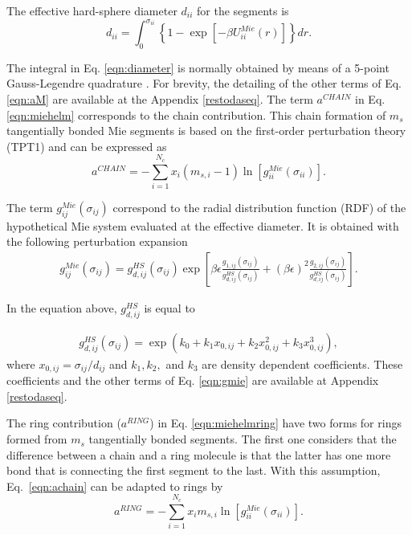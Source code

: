 	
	The effective hard-sphere diameter $d_{ii}$ for the segments is
	\begin{equation}
	d_{ii} =\int_{0}^{\sigma_{ii}} \left \lbrace 1 - \exp \left [-\beta U^{Mie}_{ii}(r) \right ] \right \rbrace dr .
	\label{eqn:diameter}
	\end{equation}
	
	
	The integral in Eq. \eqref{eqn:diameter} is normally obtained by means of a 5-point Gauss-Legendre quadrature \cite{papa2014}. For brevity, the detailing of the other terms of Eq. \eqref{eqn:aM} are available at the Appendix \ref{restodaseq}. The term $a^{CHAIN}$ in Eq. \ref{eqn:miehelm} corresponds to the chain contribution. This chain formation of $m_{s}$ tangentially bonded Mie segments is based on the first-order perturbation theory (TPT1)  \cite{papa2014} and can be expressed as
	\begin{equation}
	a^{CHAIN} =-\sum_{i=1}^{N_{c}} x_{i}(m_{s,i} - 1)\ln \left [ g_{ii}^{Mie}(\sigma_{ii}) \right] .
	\label{eqn:achain}
	\end{equation}
		
	The term $g_{ij}^{Mie}(\sigma_{ij})$ correspond to the radial distribution function (RDF) of the hypothetical Mie system evaluated at the effective diameter. It is obtained with the following perturbation expansion
	\begin{equation}
	\begin{aligned}
	g_{ij}^{Mie}(\sigma_{ij}) =g_{d,ij}^{HS}(\sigma_{ij})\exp \left [\beta\epsilon \frac{g_{1,ij}(\sigma_{ij})}{g_{d,ij}^{HS}(\sigma_{ij})} + (\beta\epsilon)^{2} \frac{g_{2,ij}(\sigma_{ij})}{g_{d,ij}^{HS}(\sigma_{ij})} \right] .
	\end{aligned}
	\label{eqn:gmie}
	\end{equation}
	
	
	In the equation above, $g_{d,ij}^{HS}$ is equal to 
	
	\begin{equation}
	\begin{aligned}
	g_{d,ij}^{HS}(\sigma_{ij}) = \exp (k_{0} + k_{1} x_{0,ij} + k_{2} x_{0,ij}^{2} + k_{3} x_{0,ij}^{3}) ,
	\end{aligned}
	\label{eqn:ghs}
	\end{equation}
	where $x_{0,ij} = \sigma_{ij}/d_{ij}$ and $k_{1}, k_{2},$ and $k_{3}$ are density dependent coefficients. These coefficients and the other terms of Eq. \ref{eqn:gmie} are available at Appendix \ref{restodaseq}.  
	
	The ring contribution ($a^{RING}$) in Eq. \ref{eqn:miehelmring} have two forms for rings formed from $m_{s}$ tangentially bonded segments. The first one  \cite{lafitte2012} considers that the difference between a chain and a ring molecule is that the latter has one more bond that is connecting the first segment to the last. With this assumption, Eq.~\eqref{eqn:achain} can be adapted to rings by
	\begin{equation}
	a^{RING} =-\sum_{i=1}^{N_{c}} x_{i}m_{s,i}\ln[g_{ii}^{Mie}(\sigma_{ii})] .
	\label{eqn:aringlafitte}
	\end{equation}
	
